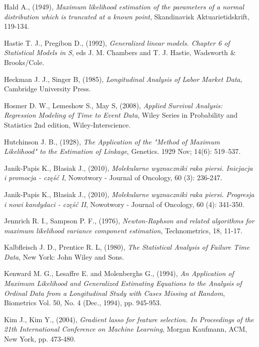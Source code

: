 \begin{thebibliography}{99}
 Hald A., (1949), \textit{Maximum likelihood estimation of the parameters of a normal distribution which is truncated at a known point}, Skandinavisk Aktuarietidskrift, 119-134.


 Hastie T. J., Pregibon D., (1992), \textit{Generalized linear models. Chapter 6 of Statistical Models in S}, eds J. M. Chambers and T. J. Hastie, Wadsworth \& Brooks/Cole.


 Heckman J. J., Singer B, (1985), \textit{Longitudinal Analysis of Labor Market Data}, Cambridge University Press.

 Hosmer D. W., Lemeshow S., May S, (2008), \textit{Applied Survival Analysis: Regression Modeling of Time to Event Data}, Wiley Series in Probability and Statistics 2nd edition, Wiley-Interscience.


 Hutchinson J. B., (1928), \textit{The Application of the "Method of Maximum Likelihood" to the Estimation of Linkage}, Genetics. 1929 Nov; 14(6): 519–537.


 Janik-Papis K., Błasiak J., (2010), \textit{Molekularne wyznaczniki raka piersi. Inicjacja i promocja - część I}, Nowotwory - Journal of Oncology, 60 (3): 236-247.

 Janik-Papis K., Błasiak J., (2010), \textit{Molekularne wyznaczniki raka piersi. Progresja i nowi kandydaci - część II}, Nowotwory - Journal of Oncology, 60 (4): 341-350.

 Jennrich R. I., Sampson P. F., (1976), \textit{Newton-Raphson and related algorithms for maximum likelihood variance component estimation}, Technometrics, 18, 11-17.


 Kalbfleisch J. D., Prentice R. L, (1980), \textit{The Statistical Analysis of Failure Time Data}, New York: John Wiley and Sons. 

 Kenward M. G., Lesaffre E. and Molenberghs G., (1994), \textit{An Application of Maximum Likelihood and Generalized Estimating Equations to the Analysis of Ordinal Data from a Longitudinal Study with Cases Missing at Random}, Biometrics Vol. 50, No. 4 (Dec., 1994), pp. 945-953.

 Kim J., Kim Y., (2004), \textit{Gradient lasso for feature selection. In Proceedings of the
21th International Conference on Machine Learning}, Morgan Kaufmann, ACM, New York, pp. 473-480.


\end{thebibliography}
